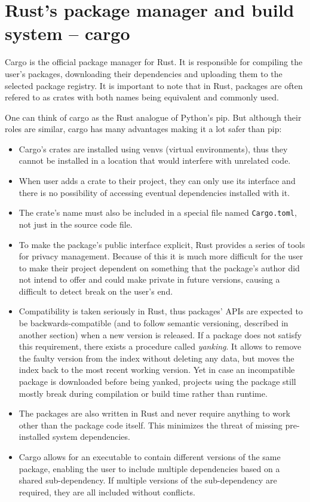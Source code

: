 \documentclass[licencjacka,en]{pracamgr}
\begin{document}
\section{Rust's package manager and build system -- cargo}

Cargo is the official package manager for Rust. It is responsible for compiling the user's packages,
downloading their dependencies and uploading them to the selected package registry. It is important
to note that in Rust, packages are often refered to as crates with both names being equivalent
and commonly used.

One can think of cargo as the Rust analogue of Python's pip. But although their roles are
similar, cargo has many advantages making it a lot safer than pip:
\begin{itemize}
	\item Cargo's crates are installed using venvs (virtual environments), thus they cannot be
		installed in a location that would interfere with unrelated code.
	\item When user adds a crate to their project, they can only use its interface and there is
		no possibility of accessing eventual dependencies installed with it.
	\item The crate's name must also be included in a special file named \texttt{Cargo.toml}, not just in the source
		code file.
	\item To make the package's public interface explicit, Rust provides a series of tools for privacy
		management. Because of this it is much more difficult for the user to make their project dependent
		on something that the package's author did not intend to offer and could make private in future
		versions, causing a difficult to detect break on the user's end.
	\item Compatibility is taken seriously in Rust, thus packages' APIs are expected to be backwards-compatible
		(and to follow semantic versioning, described in another section) when a new version is released.
		If a package does not satisfy this requirement, there exists a procedure called \textit{yanking}.
		It allows to remove the faulty version from the index without deleting any data, but moves the
		index back to the most recent working version.
		Yet in case an incompatible package is downloaded before being yanked, projects using the package
		still mostly break during compilation or build time rather than runtime.
	\item The packages are also written in Rust and never require anything to work other than the package
		code itself. This minimizes the threat of missing pre-installed system dependencies.
	\item Cargo allows for an executable to contain different versions of the same package, enabling the user to
		include multiple dependencies based on a shared sub-dependency. If multiple versions of the
		sub-dependency are required, they are all included without conflicts.
\end{itemize}
\end{document}
